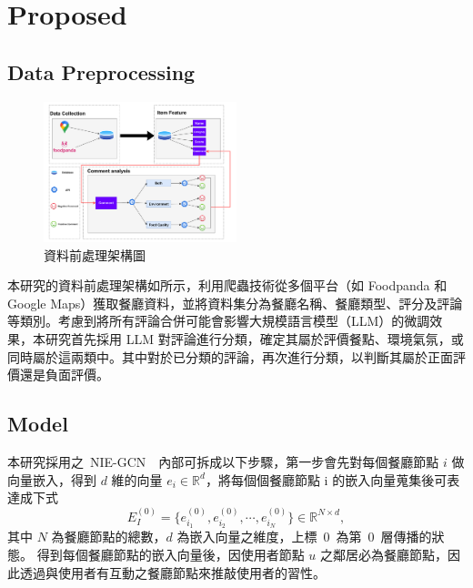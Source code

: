 \section{Proposed}
\subsection{Data Preprocessing}
\begin{figure}[tbh]
    \centering
    \includegraphics[width=0.5\textwidth]{img/preprocess.pdf}
    \caption{資料前處理架構圖}
    \label{fig-preprocess}
\end{figure}
本研究的資料前處理架構如所示，利用爬蟲技術從多個平台（如 Foodpanda 和 Google Maps）獲取餐廳資料，並將資料集分為餐廳名稱、餐廳類型、評分及評論等類別。考慮到將所有評論合併可能會影響大規模語言模型（LLM）的微調效果，本研究首先採用 LLM 對評論進行分類，確定其屬於評價餐點、環境氣氛，或同時屬於這兩類中。其中對於已分類的評論，再次進行分類，以判斷其屬於正面評價還是負面評價。
\subsection{Model}
\color{blue}
本研究採用之~NIE-GCN~\cite{NIE-GCN}~內部可拆成以下步驟，第一步會先對每個餐廳節點 $i$ 做向量嵌入，得到 $d$ 維的向量 $e_i \in \mathbb{R}^d$，將每個個餐廳節點 i 的嵌入向量蒐集後可表達成下式 
\begin{equation}
    E_I^{(0)} = \{e_{i_1}^{(0)}, e_{i_2}^{(0)},\cdots,e_{i_N}^{(0)}\} \in \mathbb{R}^{N \times d},
\end{equation}
其中 $N$ 為餐廳節點的總數，$d$ 為嵌入向量之維度，上標~$0$~為第~$0$~層傳播的狀態。
得到每個餐廳節點的嵌入向量後，因使用者節點 $u$ 之鄰居必為餐廳節點，因此透過與使用者有互動之餐廳節點來推敲使用者的習性。

